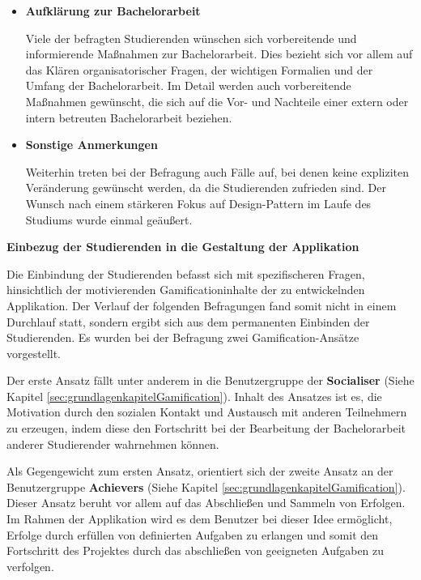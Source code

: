\documentclass{scrreprt}
\begin{document}
\begin{itemize}
\begin{itemize}
\item \textbf{Aufklärung zur Bachelorarbeit}
\par Viele der befragten Studierenden wünschen sich vorbereitende und informierende Maßnahmen zur Bachelorarbeit. Dies bezieht sich vor allem auf das Klären organisatorischer Fragen, der wichtigen Formalien und der Umfang der Bachelorarbeit. Im Detail werden auch vorbereitende Maßnahmen gewünscht, die sich auf die Vor- und Nachteile einer extern oder intern betreuten Bachelorarbeit beziehen.

\item \textbf{Sonstige Anmerkungen}
\par Weiterhin treten bei der Befragung auch Fälle auf, bei denen keine expliziten Veränderung gewünscht werden, da die Studierenden zufrieden sind. Der Wunsch nach einem stärkeren Fokus auf Design-Pattern im Laufe des Studiums wurde einmal geäußert.

\end{itemize}

\end{itemize}

\newpage
\par \textbf{Einbezug der Studierenden in die Gestaltung der Applikation}
\par\medskip Die Einbindung der Studierenden befasst sich mit spezifischeren Fragen, hinsichtlich der motivierenden Gamificationinhalte der zu entwickelnden Applikation. Der Verlauf der folgenden Befragungen fand somit nicht in einem Durchlauf statt, sondern ergibt sich aus dem permanenten Einbinden der Studierenden. Es wurden bei der Befragung zwei Gamification-Ansätze vorgestellt.
\par\medskip Der erste Ansatz fällt unter anderem in die Benutzergruppe der \textbf{Socialiser} (Siehe Kapitel \ref{sec:grundlagenkapitelGamification}). Inhalt des Ansatzes ist es, die Motivation durch den sozialen Kontakt und Austausch mit anderen Teilnehmern zu erzeugen, indem diese den Fortschritt bei der Bearbeitung der Bachelorarbeit anderer Studierender wahrnehmen können.
\par\medskip Als Gegengewicht zum ersten Ansatz, orientiert sich der zweite Ansatz an der Benutzergruppe \textbf{Achievers} (Siehe Kapitel \ref{sec:grundlagenkapitelGamification}). Dieser Ansatz beruht vor allem auf das Abschließen und Sammeln von Erfolgen. Im Rahmen der Applikation wird es dem Benutzer bei dieser Idee ermöglicht, Erfolge durch erfüllen von definierten Aufgaben zu erlangen und somit den Fortschritt des Projektes durch das abschließen von geeigneten Aufgaben zu verfolgen.
\end{document}
